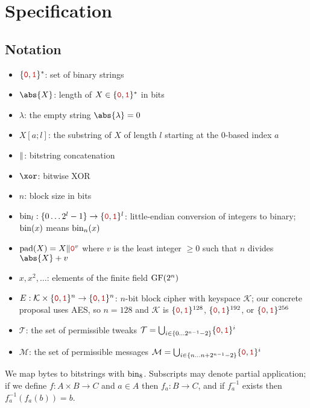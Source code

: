 \documentclass[hctr2.tex]{subfiles}
\begin{document}
\section{Specification}\label{specification}

\subsection{Notation}
\begin{itemize}
    \item \(\bin^{*}\): set of binary strings
    \item $\abs{X}$: length of $X \in \bin^{*}$ in bits
    \item $\lambda$: the empty string $\abs{\lambda} = 0$
    \item $X[a;l]$: the substring of $X$ of length $l$ starting at the 0-based index $a$
    \item $\Vert$: bitstring concatenation
    \item \(\xor\): bitwise XOR
    \item \(n\): block size in bits
    \item $\fromint_l: \{0 \ldots 2^l-1\} \rightarrow \bin^l$:
    little-endian conversion of integers to binary; 
    \(\operatorname{bin}(x)\) means \(\operatorname{bin}_n(x)\)
    \item $\pad(X) = X \Concat \bino^v$
    where $v$ is the least integer $\geq 0$ such that $n$ divides $\abs{X} + v$
    \item \(x, x^2, \ldots\): elements of the finite field \(\operatorname{GF}(2^n)\)
    \item \(E: \mathcal{K} \times \bin^n \rightarrow \bin^n\): 
    \(n\)-bit block cipher with keyspace \(\mathcal{K}\);
    our concrete proposal uses AES\cite{aes},
    so \(n=128\) and \(\mathcal{K}\) is
    \(\bin^{128}\), \(\bin^{192}\), or \(\bin^{256}\)
    \item \(\mathcal{T}\): the set of permissible tweaks
    \(\mathcal{T} = \bigcup_{i \in \{0\ldots2^{n-1}-2\}}\bin^i\)
    \item \(\mathcal{M}\): the set of permissible messages
    \(\mathcal{M} = \bigcup_{i \in \{n\ldots n + 2^{n-1}-2\}}\bin^i\)
\end{itemize}
We map bytes to bitstrings with \(\operatorname{bin}_8\). Subscripts may denote partial application; if we define $f: A \times B \rightarrow C$ and
$a \in A$ then $f_a: B \rightarrow C$, and if $f_a^{-1}$ exists then $f_a^{-1}(f_a(b)) = b$.
\end{document}
